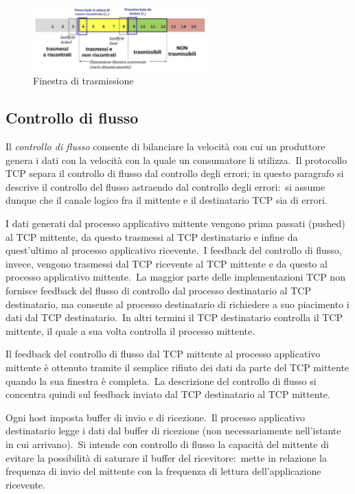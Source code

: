 \begin{figure}[H]
    \centering
    \includegraphics[width=0.6\textwidth]{immagini/Finestra_di_trasmissione.jpg}
    \caption*{Finestra di trasmissione}
\end{figure}

\subsection{Controllo di flusso}

Il \emph{controllo di flusso} consente di bilanciare la velocità con cui un produttore genera i dati con la velocità con la quale un consumatore li utilizza.\
Il protocollo TCP separa il controllo di flusso dal controllo degli errori; in questo paragrafo si descrive il controllo del flusso astraendo dal controllo degli errori:\ si assume dunque che il canale logico fra il mittente e il destinatario TCP sia di errori.

I dati generati dal processo applicativo mittente vengono prima passati (pushed) al TCP mittente, da questo trasmessi al TCP destinatario e infine da quest'ultimo al processo applicativo ricevente.\
I feedback del controllo di flusso, invece, vengono trasmessi dal TCP ricevente al TCP mittente e da questo al processo applicativo mittente.\
La maggior parte delle implementazioni TCP non fornisce feedback del flusso di controllo dal processo destinatario al TCP destinatario, ma consente al processo destinatario di richiedere a suo piacimento i dati dal TCP destinatario.\
In altri termini il TCP destinatario controlla il TCP mittente, il quale a sua volta controlla il processo mittente.

Il feedback del controllo di flusso dal TCP mittente al processo applicativo mittente è ottenuto tramite il semplice rifiuto dei dati da parte del TCP mittente quando la sua finestra è completa.\
La descrizione del controllo di flusso si concentra quindi sul feedback inviato dal TCP destinatario al TCP mittente.

\vspace{12pt}

\noindent Ogni host imposta buffer di invio e di ricezione.\
Il processo applicativo destinatario legge i dati dal buffer di ricezione (non necessariamente nell'istante in cui arrivano).\
Si intende con controllo di flusso la capacità del mittente di evitare la possibilità di saturare il buffer del ricevitore:\ mette in relazione la frequenza di invio del mittente con la frequenza di lettura dell'applicazione ricevente.

